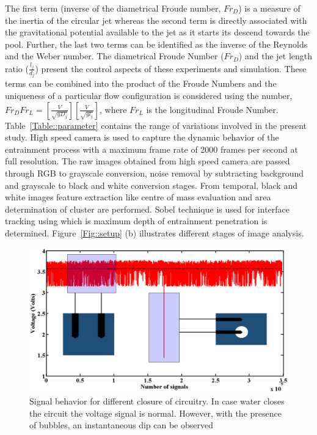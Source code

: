 The first term (inverse of the diametrical Froude number, $Fr_D$) is a measure of the inertia of the circular jet whereas the second term is directly associated with the gravitational potential available to the jet as it starts its descend towards the pool. Further, the last two terms can be identified as the inverse of the Reynolds and the Weber number. The diametrical Froude Number ($Fr_D$) and the jet length ratio ($\frac{l_j}{d_j}$) present the control aspects of these experiments and simulation. These terms can be combined into the product of the Froude Numbers and the uniqueness of a particular flow configuration is considered using the number, $Fr_DFr_L = \left[\frac{V}{\sqrt{gD_j}}\right]\left[\frac{V}{\sqrt{gl_j}}\right]$, where $Fr_L$ is the longitudinal Froude Number. Table~\ref{Table::parameter} contains the range of variations involved in the present study. High speed camera is used to capture the dynamic behavior of the entrainment process with a maximum frame rate of 2000 frames per second at full resolution. 
The raw images obtained from high speed camera are passed through RGB to grayscale conversion, noise removal by subtracting background and grayscale to black and white conversion stages. From temporal, black and white images feature extraction like centre of mass evaluation and area determination of cluster are performed. Sobel technique is used for interface tracking using which is maximum depth of entrainment penetration is determined. Figure~\ref{Fig::setup} (b) illustrates different stages of image analysis. \\
\begin{figure}
	\centering
	\includegraphics[width=\linewidth]{chapters/jetPool/Figure2}
	\caption{Signal behavior for different closure of circuitry. In case water closes the circuit the voltage signal is normal. However, with the presence of bubbles, an instantaneous dip can be observed}
	\label{Figure::show}
\end{figure}
